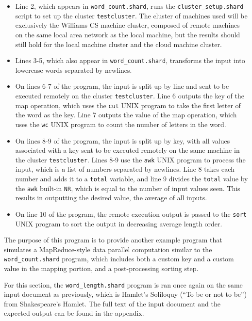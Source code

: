 \documentclass[twoside]{report}
\begin{document}
\begin{itemize}
  \item
        Line 2, which appears in \texttt{word\_count.shard}, runs the \texttt{cluster\_setup.shard} script to set up the cluster \texttt{testcluster}.
        The cluster of machines used will be exclusively the Williams CS machine cluster, composed of remote machines on the same local area network as the local machine, but the results should still hold for the local machine cluster and the cloud machine cluster.
  \item Lines 3-5, which also appear in \texttt{word\_count.shard}, transforms the input into lowercase words separated by newlines.
  \item On lines 6-7 of the program, the input is split up by line and sent to be executed remotely on the cluster \texttt{testcluster}.
        Line 6 outputs the key of the map operation, which uses the \texttt{cut} UNIX program to take the first letter of the word as the key.
        Line 7 outputs the value of the map operation, which uses the \texttt{wc} UNIX program to count the number of letters in the word.
  \item  On lines 8-9 of the program, the input is split up by key, with all values associated with a key sent to be executed remotely on the same machine in the cluster \texttt{testcluster}.
        Lines 8-9 use the \texttt{awk} UNIX program to process the input, which is a list of numbers separated by newlines.
        Line 8 takes each number and adds it to a \texttt{total} variable, and line 9 divides the \texttt{total} value by the \texttt{awk} built-in \texttt{NR}, which is equal to the number of input values seen. This results in outputting the desired value, the average of all inputs.
  \item On line 10 of the program, the remote execution output is passed to the \texttt{sort} UNIX program to sort the output in decreasing average length order.
\end{itemize}
The purpose of this program is to provide another example program that simulates a MapReduce-style data parallel computation similar to the \texttt{word\_count.shard} program, which includes both a custom key and a custom value in the mapping portion, and a post-processing sorting step.

For this section, the \texttt{word\_length.shard} program is ran once again on the same input document as previously, which is Hamlet's Soliloquy (``To be or not to be'') from Shakespeare's Hamlet.
The full text of the input document and the expected output can be found in the appendix.
\end{document}
